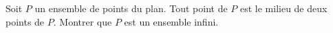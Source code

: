 Soit $P$ un ensemble de points du plan. Tout point de $P$ est le milieu de
deux points de $P$. Montrer que $P$ est un ensemble infini.
